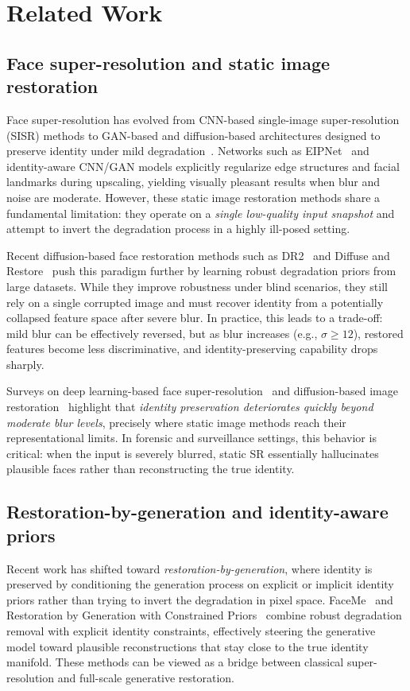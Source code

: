 \documentclass{ieeeaccess}
\begin{document}
\section{Related Work}
\label{sec:related}

\subsection{Face super-resolution and static image restoration}
Face super-resolution has evolved from CNN-based single-image super-resolution (SISR) methods to GAN-based and diffusion-based architectures designed to preserve identity under mild degradation~\cite{Survey2021,GFPGAN}. Networks such as EIPNet~\cite{EIPNet} and identity-aware CNN/GAN models explicitly regularize edge structures and facial landmarks during upscaling, yielding visually pleasant results when blur and noise are moderate. However, these static image restoration methods share a fundamental limitation: they operate on a \emph{single low-quality input snapshot} and attempt to invert the degradation process in a highly ill-posed setting.

Recent diffusion-based face restoration methods such as DR2~\cite{DR2} and Diffuse and Restore~\cite{DiffuseRestore} push this paradigm further by learning robust degradation priors from large datasets. While they improve robustness under blind scenarios, they still rely on a single corrupted image and must recover identity from a potentially collapsed feature space after severe blur. In practice, this leads to a trade-off: mild blur can be effectively reversed, but as blur increases (e.g., $\sigma \geq 12$), restored features become less discriminative, and identity-preserving capability drops sharply.

Surveys on deep learning-based face super-resolution~\cite{Survey2021} and diffusion-based image restoration~\cite{SurveyDiffusionISR} highlight that \emph{identity preservation deteriorates quickly beyond moderate blur levels}, precisely where static image methods reach their representational limits. In forensic and surveillance settings, this behavior is critical: when the input is severely blurred, static SR essentially hallucinates plausible faces rather than reconstructing the true identity.

\subsection{Restoration-by-generation and identity-aware priors}
Recent work has shifted toward \emph{restoration-by-generation}, where identity is preserved by conditioning the generation process on explicit or implicit identity priors rather than trying to invert the degradation in pixel space. FaceMe~\cite{FaceMe2025} and Restoration by Generation with Constrained Priors~\cite{RestorationByGeneration} combine robust degradation removal with explicit identity constraints, effectively steering the generative model toward plausible reconstructions that stay close to the true identity manifold. These methods can be viewed as a bridge between classical super-resolution and full-scale generative restoration.
\end{document}
